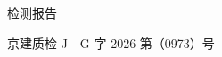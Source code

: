 \documentclass[11pt, a4paper, UTF8]{ctexart}
\newcommand{\ReportYear}{2026} %
\newcommand{\ReportNo}{0973} %
\newcommand{\ReportOversee}{建} %
\newcommand{\ReportModel}{G} %
\begin{document}

\begin{titlepage}
    \pagestyle{empty}
    
    \vspace*{20mm}

    \begin{center}
        {\heiti{} 检\hspace{0.5\ccwd}测\hspace{0.5\ccwd}报\hspace{0.5\ccwd}告}
    \end{center}

    \vspace{0mm}

    \begin{center}
        {\songti{} 京\ReportOversee{}质检 J—\ReportModel{} 字 \ReportYear{} 第（\ReportNo{}）号}
    \end{center}

    \vspace{40mm} 


\end{titlepage}
\end{document}
